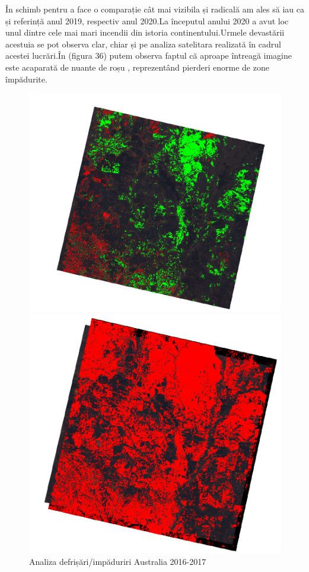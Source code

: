 \documentclass[12pt,a4paper]{article}
\theoremstyle{definition}
\theoremstyle{remark}
\begin{document}
În schimb pentru a face o comparație cât mai vizibila și radicală am ales să iau ca și referință anul 2019, respectiv anul 2020.La începutul anului 2020 a avut loc unul dintre cele mai mari incendii din istoria continentului.Urmele devastării acestuia se pot observa clar, chiar și pe analiza satelitara realizată în cadrul acestei lucrări.În (figura 36) putem observa faptul că aproape întreagă imagine este acaparată de nuante  de roșu , reprezentând pierderi enorme de zone împădurite.
\begin{figure}[!htb]
   \begin{minipage}{0.48\textwidth}
     \centering
     \includegraphics[width=1\linewidth]{ndvi2016-201.PNG}
     \caption{Analiza defrișări/impăduriri Australia 2016-2017}
   \end{minipage}\hfill
   \begin{minipage}{0.48\textwidth}
     \centering
     \includegraphics[width=1\linewidth]{ndvi2019-2020.PNG}

\end{minipage}
\end{figure}
\end{document}
